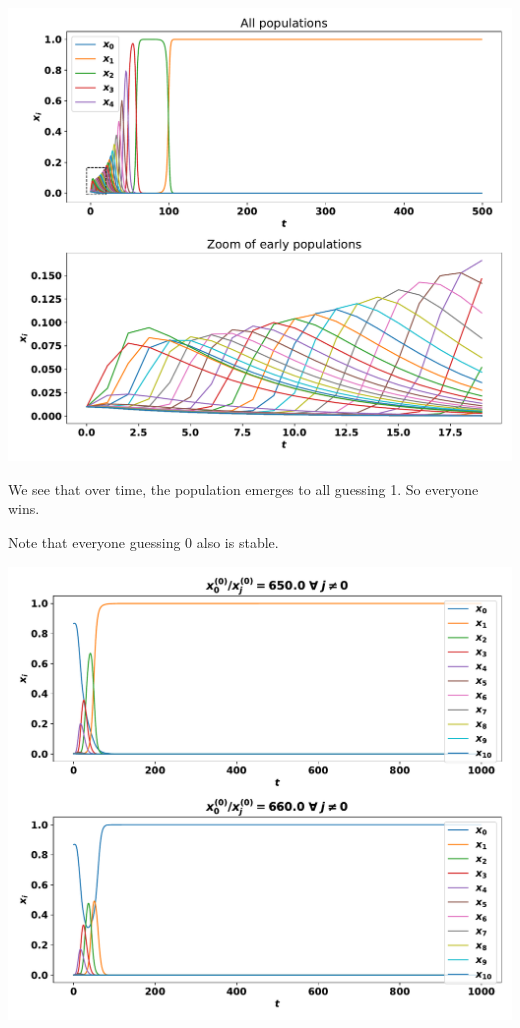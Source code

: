 \documentclass{beamer}              %
\begin{document}
\begin{frame}
    \begin{center}
        \includegraphics[width=.8\textwidth]{./static/two_thirds_of_the_average_game/numerical_solution_of_replicator_dynamics/main.pdf}
    \end{center}
\end{frame}

\begin{frame}
    We see that over time, the population emerges to all guessing 1. So everyone
    wins.

     Note that everyone guessing 0 also is stable. 
\end{frame}

\begin{frame}
    \begin{center}
        \includegraphics[width=.8\textwidth]{./static/two_thirds_of_the_average_game/numerical_solution_of_replicator_dynamics_with_different_starting_populations/main.pdf}
    \end{center}
\end{frame}
\end{document}

